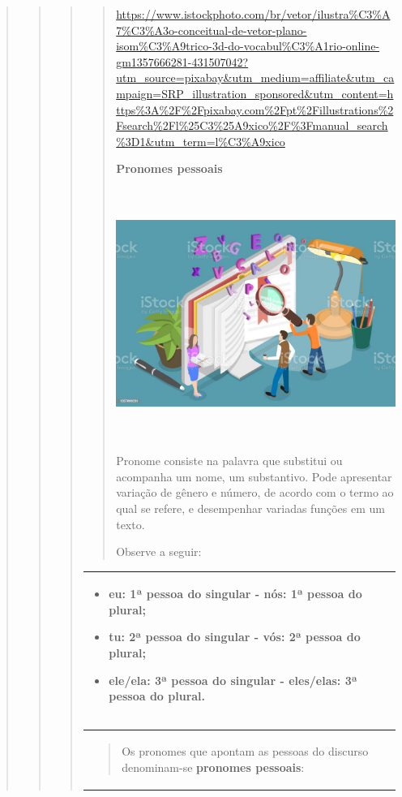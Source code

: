 \begin{quote}
\begin{quote}
\begin{quote}
\begin{quote}
\url{https://www.istockphoto.com/br/vetor/ilustra\%C3\%A7\%C3\%A3o-conceitual-de-vetor-plano-isom\%C3\%A9trico-3d-do-vocabul\%C3\%A1rio-online-gm1357666281-431507042?utm_source=pixabay\&utm_medium=affiliate\&utm_campaign=SRP_illustration_sponsored\&utm_content=https\%3A\%2F\%2Fpixabay.com\%2Fpt\%2Fillustrations\%2Fsearch\%2Fl\%25C3\%25A9xico\%2F\%3Fmanual_search\%3D1\&utm_term=l\%C3\%A9xico}

\textbf{Pronomes pessoais}

\includegraphics[width=4.81250in,height=3.20531in]{media/image33.jpeg}

Pronome consiste na palavra que substitui ou acompanha um nome, um
substantivo. Pode apresentar variação de gênero e número, de acordo com
o termo ao qual se refere, e desempenhar variadas funções em um texto.

Observe a seguir:
\end{quote}

\begin{longtable}[]{@{}l@{}}
\toprule
\begin{minipage}[t]{0.97\columnwidth}\raggedright\strut
\begin{itemize}
\item
  eu: 1ª pessoa do singular - nós: 1ª pessoa do plural;
\item
  tu: 2ª pessoa do singular - vós: 2ª pessoa do plural;
\item
  ele/ela: 3ª pessoa do singular - eles/elas: 3ª pessoa do plural.
\end{itemize}\strut
\end{minipage}\tabularnewline
\bottomrule
\end{longtable}

\begin{longtable}[]{@{}l@{}}
\toprule
\begin{minipage}[t]{0.97\columnwidth}\raggedright\strut
\begin{quote}
Os pronomes que apontam as pessoas do discurso denominam-se
\textbf{pronomes pessoais}:
\end{quote}


\end{minipage}
\end{longtable}
\end{quote}
\end{quote}
\end{quote}
